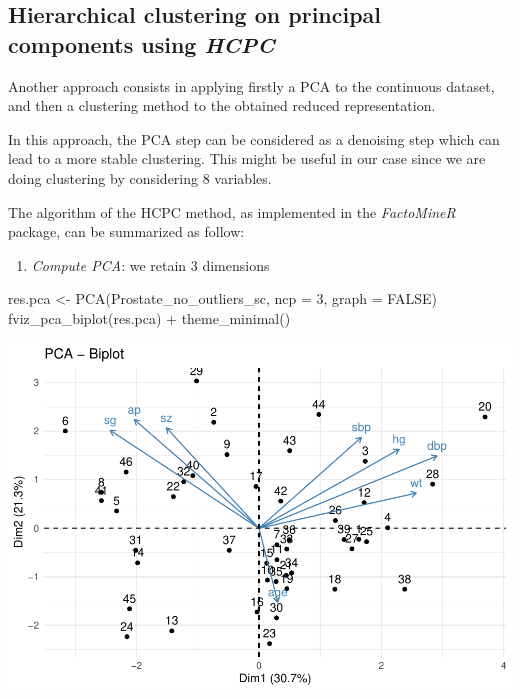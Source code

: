 \documentclass[
]{article}
\newenvironment{Shaded}{\begin{snugshade}}{\end{snugshade}}
\newcommand{\AttributeTok}[1]{\textcolor[rgb]{0.77,0.63,0.00}{#1}}
\newcommand{\ConstantTok}[1]{\textcolor[rgb]{0.00,0.00,0.00}{#1}}
\newcommand{\DecValTok}[1]{\textcolor[rgb]{0.00,0.00,0.81}{#1}}
\newcommand{\FunctionTok}[1]{\textcolor[rgb]{0.00,0.00,0.00}{#1}}
\newcommand{\NormalTok}[1]{#1}
\newcommand{\OtherTok}[1]{\textcolor[rgb]{0.56,0.35,0.01}{#1}}
\newcommand{\SpecialCharTok}[1]{\textcolor[rgb]{0.00,0.00,0.00}{#1}}
\providecommand{\tightlist}{%
  \setlength{\itemsep}{0pt}\setlength{\parskip}{0pt}}
\begin{document}
\hypertarget{hierarchical-clustering-on-principal-components-using-hcpc}{%
\subsection{\texorpdfstring{Hierarchical clustering on principal
components using
\emph{HCPC}}{Hierarchical clustering on principal components using HCPC}}\label{hierarchical-clustering-on-principal-components-using-hcpc}}

Another approach consists in applying firstly a PCA to the continuous
dataset, and then a clustering method to the obtained reduced
representation.

In this approach, the PCA step can be considered as a denoising step
which can lead to a more stable clustering. This might be useful in our
case since we are doing clustering by considering 8 variables.

The algorithm of the HCPC method, as implemented in the
\emph{FactoMineR} package, can be summarized as follow:

\begin{enumerate}
\def\labelenumi{\arabic{enumi}.}
\tightlist
\item
  \emph{Compute PCA}: we retain 3 dimensions
\end{enumerate}

\begin{Shaded}
\begin{Highlighting}[]
\NormalTok{res.pca }\OtherTok{\textless{}{-}} \FunctionTok{PCA}\NormalTok{(Prostate\_no\_outliers\_sc, }\AttributeTok{ncp =} \DecValTok{3}\NormalTok{, }\AttributeTok{graph =} \ConstantTok{FALSE}\NormalTok{)}
\FunctionTok{fviz\_pca\_biplot}\NormalTok{(res.pca) }\SpecialCharTok{+}
       \FunctionTok{theme\_minimal}\NormalTok{()}
\end{Highlighting}
\end{Shaded}

\includegraphics{clustering_files/figure-latex/unnamed-chunk-47-1.pdf}
\end{document}
